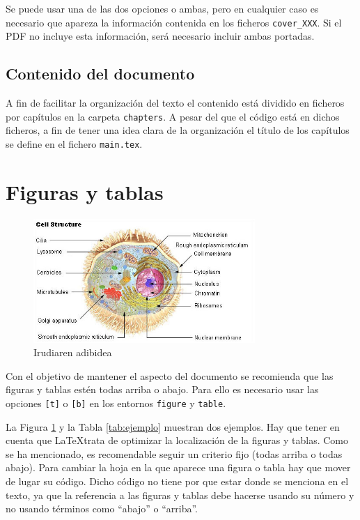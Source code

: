 Se puede usar una de las dos opciones o ambas, pero en cualquier caso es necesario que apareza la información contenida en los ficheros \texttt{cover\_XXX}. Si el PDF no incluye esta información, será necesario incluir ambas portadas.


\subsection{Contenido del documento}

A fin de facilitar la organización del texto el contenido está dividido en ficheros por capítulos en la carpeta \texttt{chapters}. A pesar del que el código está en dichos ficheros, a fin de tener una idea clara de la organización el título de los capítulos se define en el fichero \texttt{main.tex}.


\section{Figuras y tablas}

\begin{figure}[t]
	\centering
	\includegraphics[width=0.75\textwidth]{figures/cell.jpg}
	\caption{Irudiaren adibidea}\label{fig:ejemplo}
\end{figure}

Con el objetivo de mantener el aspecto del documento se recomienda que las figuras y tablas estén todas arriba o abajo. Para ello es necesario usar las opciones \texttt{[t]} o \texttt{[b]} en los entornos \texttt{figure} y \texttt{table}.

La Figura \ref{fig:ejemplo} y la Tabla \ref{tab:ejemplo} muestran dos ejemplos. Hay que tener en cuenta que \LaTeX trata de optimizar la localización de la figuras y tablas. Como se ha mencionado, es recomendable seguir un criterio fijo (todas arriba o todas abajo). Para cambiar la hoja en la que aparece una figura o tabla hay que mover de lugar su código. Dicho código no tiene por que estar donde se menciona en el texto, ya que la referencia a las figuras y tablas debe hacerse usando su número y no usando términos como ``abajo'' o ``arriba''.

